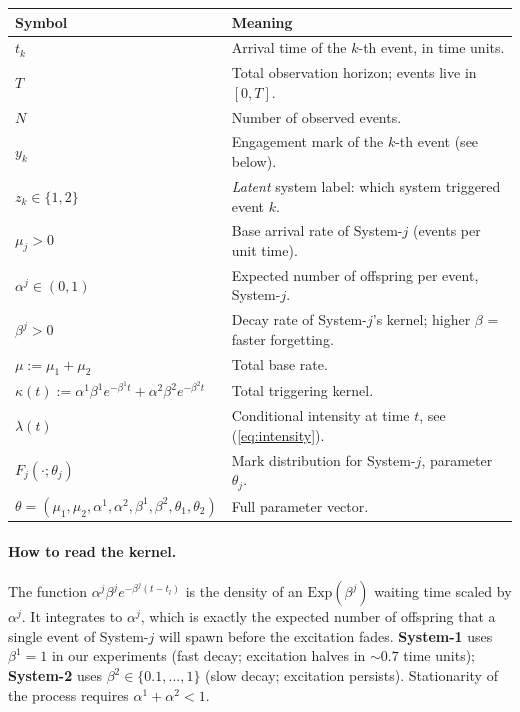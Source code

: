 \documentclass[11pt]{article}
\begin{document}
\begin{center}
\begin{tabular}{@{}lp{10cm}@{}}
\toprule
Symbol & Meaning \\
\midrule
$t_k$                            & Arrival time of the $k$-th event, in time units. \\
$T$                              & Total observation horizon; events live in $[0, T]$. \\
$N$                              & Number of observed events. \\
$y_k$                            & Engagement mark of the $k$-th event (see below). \\
$z_k \in \{1, 2\}$               & \emph{Latent} system label: which system triggered event $k$. \\[0.3em]
$\mu_j > 0$                      & Base arrival rate of System-$j$ (events per unit time). \\
$\alpha^j \in (0, 1)$            & Expected number of offspring per event, System-$j$. \\
$\beta^j > 0$                    & Decay rate of System-$j$'s kernel; higher $\beta$ = faster forgetting. \\[0.3em]
$\mu := \mu_1 + \mu_2$           & Total base rate. \\
$\kappa(t) := \alpha^1 \beta^1 e^{-\beta^1 t} + \alpha^2 \beta^2 e^{-\beta^2 t}$ & Total triggering kernel. \\
$\lambda(t)$                     & Conditional intensity at time $t$, see (\ref{eq:intensity}). \\[0.3em]
$F_j(\cdot; \theta_j)$           & Mark distribution for System-$j$, parameter $\theta_j$. \\
$\theta = (\mu_1, \mu_2, \alpha^1, \alpha^2, \beta^1, \beta^2, \theta_1, \theta_2)$ & Full parameter vector. \\
\bottomrule
\end{tabular}
\end{center}

\paragraph{How to read the kernel.} The function $\alpha^j \beta^j e^{-\beta^j(t - t_l)}$ is the density of an $\mathrm{Exp}(\beta^j)$ waiting time scaled by $\alpha^j$. It integrates to $\alpha^j$, which is exactly the expected number of offspring that a single event of System-$j$ will spawn before the excitation fades. \textbf{System-1} uses $\beta^1 = 1$ in our experiments (fast decay; excitation halves in $\sim 0.7$ time units); \textbf{System-2} uses $\beta^2 \in \{0.1, \dots, 1\}$ (slow decay; excitation persists). Stationarity of the process requires $\alpha^1 + \alpha^2 < 1$.
\end{document}
